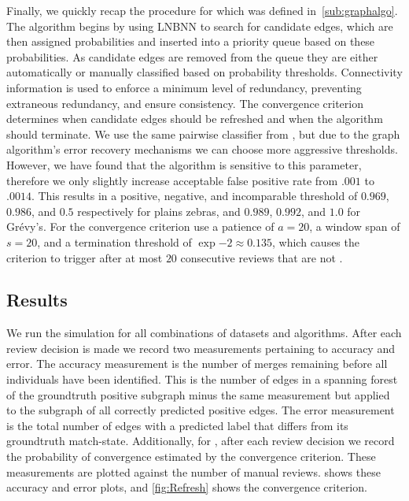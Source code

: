     Finally, we quickly recap the procedure for  which was defined in~\cref{sub:graphalgo}.
    The algorithm begins by using LNBNN to search for candidate edges, which are then assigned probabilities and
      inserted into a priority queue based on these probabilities.
    As candidate edges are removed from the queue they are either automatically or manually classified based on
      probability thresholds.
    Connectivity information is used to enforce a minimum level of redundancy, preventing extraneous redundancy,
      and ensure consistency.
    The convergence criterion determines when candidate edges should be refreshed and when the algorithm should
      terminate.
    We use the same pairwise classifier from , but due to the graph algorithm's error recovery
      mechanisms we can choose more aggressive thresholds.
    However, we have found that the algorithm is sensitive to this parameter, therefore we only slightly increase
      acceptable false positive rate from $.001$ to $.0014$.
    This results in a positive, negative, and incomparable threshold of $0.969$, $0.986$, and $0.5$ respectively
      for plains zebras, and $0.989$, $0.992$, and $1.0$ for Grévy's.
    For the convergence criterion use a patience of $a=20$, a window span of $s=20$, and a termination threshold
      of $\exp{-2}\approx0.135$, which causes the criterion to trigger after at most $20$ consecutive reviews that
      are not \meaningful{}.

    \subsection{Results}

    We run the simulation for all combinations of datasets and algorithms.
    After each review decision is made we record two measurements pertaining to accuracy and error.
    The accuracy measurement is the number of merges remaining before all individuals have been identified.
    This is the number of edges in a spanning forest of the groundtruth positive subgraph minus the same
      measurement but applied to the subgraph of all correctly predicted positive edges.
    The error measurement is the total number of edges with a predicted label that differs from its groundtruth
      match-state.
    Additionally, for , after each review decision we record the probability of convergence estimated
      by the convergence criterion.
    These measurements are plotted against the number of manual reviews.
     shows these accuracy and error plots, and \cref{fig:Refresh} shows the convergence
      criterion.

